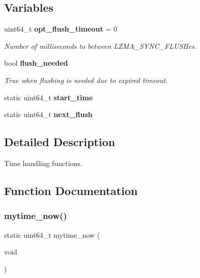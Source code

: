 \subsection*{Variables}
\begin{DoxyCompactItemize}
\item 
uint64\+\_\+t \textbf{ opt\+\_\+flush\+\_\+timeout} = 0
\begin{DoxyCompactList}\small\item\em Number of milliseconds to between L\+Z\+M\+A\+\_\+\+S\+Y\+N\+C\+\_\+\+F\+L\+U\+S\+Hes. \end{DoxyCompactList}\item 
bool \textbf{ flush\+\_\+needed}
\begin{DoxyCompactList}\small\item\em True when flushing is needed due to expired timeout. \end{DoxyCompactList}\item 
\mbox{\label{mytime_8c_a5b11efea935978e9f1913e964a5e5396}} 
static uint64\+\_\+t {\bfseries start\+\_\+time}
\item 
\mbox{\label{mytime_8c_af6b93fa2981864c6e2f0358edfa88897}} 
static uint64\+\_\+t {\bfseries next\+\_\+flush}
\end{DoxyCompactItemize}


\subsection{Detailed Description}
Time handling functions. 



\subsection{Function Documentation}
\mbox{\label{mytime_8c_aa88d8754572c09d04f39023b7532a669}} 
\subsubsection{mytime\+\_\+now()}
{\footnotesize\ttfamily static uint64\+\_\+t mytime\+\_\+now (\begin{DoxyParamCaption}\item[{void}]{ }\end{DoxyParamCaption})\hspace{0.3cm}{\ttfamily [static]}}



